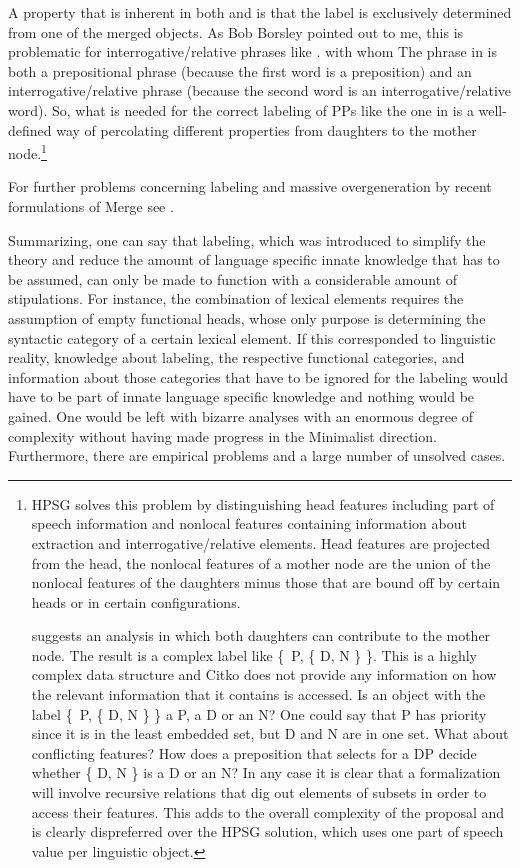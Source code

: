 A property that is inherent in both  and  is that the label
is exclusively determined from one of the merged objects. As Bob Borsley pointed out to me, this is
problematic for interrogative/relative phrases like .
\ea
with whom
\z
The phrase in  is both a prepositional phrase (because the first word is a preposition) and
an interrogative/relative phrase (because the second word is an interrogative/relative word). So, what
is needed for the correct labeling of PPs like the one in  is a well-defined way of
percolating different properties from daughters to the mother node.\footnote{%
HPSG solves this problem by
distinguishing head features including part of speech information and nonlocal features containing
information about extraction and interrogative/relative elements. Head features are projected from
the head, the nonlocal features of a mother node are the union of the nonlocal features of the
daughters minus those that are bound off by certain heads or in certain configurations.

\citet[]{Citko2008a} suggests an analysis in which both daughters can contribute to the
mother node. The result is a complex label like \{~P, \{ D, N \} \}. This is a highly complex data
structure and Citko does not provide any information on how the relevant information that it
contains is accessed. Is an object with the label \{~P, \{ D, N \} \} a P, a D or an N? One could
say that P has priority since it is in the least embedded set, but D and N are in one set. What about
conflicting features? How does a preposition that selects for a DP decide whether \{ D, N \} is a D
or an N? In any case it is clear that a formalization will involve recursive relations that dig out
elements of subsets in order to access their features. This adds to the overall complexity of the
proposal and is clearly dispreferred over the HPSG solution, which uses one part of speech value per linguistic object.
}

\addlines[-1]
For further problems concerning labeling and massive overgeneration by recent formulations of Merge
see .

Summarizing, one can say that labeling, which was introduced to simplify the theory and reduce the
amount of language specific innate knowledge that has to be assumed, can only be made to function with a
considerable amount of stipulations. For instance, the combination of lexical elements requires the
assumption of empty functional heads, whose only purpose is determining the syntactic
category of a certain lexical element. If this corresponded to linguistic reality, knowledge
about labeling, the respective functional categories, and information about those categories that
have to be ignored for the labeling would have to be part of innate language specific knowledge and
nothing would be gained. One would be left with bizarre analyses with an enormous degree of complexity without
having made progress in the Minimalist direction. Furthermore, there are empirical problems and
a large number of unsolved cases.

